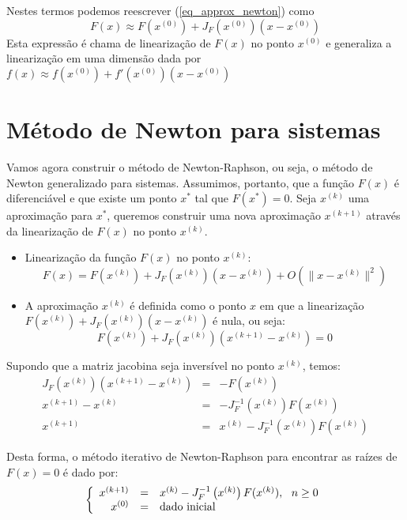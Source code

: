 Nestes termos podemos reescrever (\ref{eq_approx_newton}) como
$$F(x)\approx F(x^{(0)}) + J_F(x^{(0)}) (x-x^{(0)})$$
Esta expressão é chama de linearização de $F(x)$ no ponto $x^{(0)}$ e generaliza a linearização em uma dimensão dada por $f(x)\approx f(x^{(0)})+f'(x^{(0)}) (x-x^{(0)})$



\section{Método de  Newton para sistemas}
Vamos agora construir o método de Newton-Raphson, ou seja, o método de Newton generalizado para sistemas. Assumimos, portanto, que a função $F(x)$ é diferenciável e que existe um ponto $x^*$ tal que $F(x^*)=0$. Seja $x^{(k)}$ uma aproximação para $x^*$, queremos construir uma nova aproximação $x^{(k+1)}$ através da linearização de $F(x)$ no ponto $x^{(k)}$.

\begin{itemize}
\item Linearização da função $F(x)$ no ponto $x^{(k)}$: 
  \begin{equation*}
F(x)= F(x^{(k)})+ J_F\left(x^{(k)}\right) \left(x-x^{(k)}\right)  + O\left(\|x-x^{(k)}\|^2\right)    
  \end{equation*}
\item A aproximação $x^{(k)}$ é definida como o ponto $x$ em que a linearização $F(x^{(k)})+ J_F\left(x^{(k)}\right) \left(x-x^{(k)}\right)$ é nula, ou seja:
$$F(x^{(k)})+ J_F\left(x^{(k)}\right) \left(x^{(k+1)}-x^{(k)}\right)=0$$
\end{itemize}

Supondo que a matriz jacobina seja inversível no ponto $x^{(k)}$, temos:
\begin{eqnarray*}
J_F\left(x^{(k)}\right) \left(x^{(k+1)}-x^{(k)}\right)&=&-F(x^{(k)})\\
x^{(k+1)}-x^{(k)}&=&-J_F^{-1}\left(x^{(k)}\right)F(x^{(k)})\\
x^{(k+1)}&=&x^{(k)}-J_F^{-1}\left(x^{(k)}\right)F(x^{(k)})
\end{eqnarray*}

Desta forma, o método iterativo de Newton-Raphson para encontrar as raízes de $F(x)=0$ é dado por:
\begin{equation*}
\left\{\begin{array}{rcl}
x^{(k+1)} &=& x^{(k)}-J_F^{-1}\left(x^{(k)}\right)F(x^{(k)}),~~ n\geq 0\\
x^{(0)}&=&\hbox{dado inicial}
\end{array}\right.  
\end{equation*}

